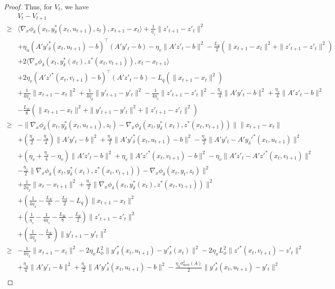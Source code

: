 \documentclass[10pt,a4paper]{amsart}
\newcommand{\pth}[1]{\left( #1 \right)}
\begin{document}
\begin{proof}
Thus, for $V_t$, we have
\begin{align*}
    &V_t-V_{t+1}\\
    \geq& \langle\nabla_x \phi_\delta(x_t, y^*_\delta(x_t, u_{t+1}), z_t), x_{t+1}-x_t\rangle+\frac{1}{\eta_z}\|z'_{t+1}-z'_t\|^2\\
    &+\eta_u(A'y'^*_\delta(x_t,u_{t+1})-b)^\top(A'y'_t-b)-\eta_v\|A'z'_t-b\|^2-\frac{L_d}{2}(\|x_{t+1}-x_t\|^2+\|z'_{t+1}-z'_t\|^2)\\
    &+2\langle\nabla_x \phi_\delta(x_t, y^*_\delta(x_t), z^*(x_t, v_{t+1})), x_t-x_{t+1}\rangle\\
    &+2\eta_v(A'z'^*(x_t,v_{t+1})-b)^\top(A'z'_t-b)-L_q(\|x_{t+1}-x_t\|^2)\\
    &+\frac{1}{4\eta_x}\|x_{t+1}-x_t\|^2+\frac{1}{4\eta_y}\|y'_{t+1}-y'_t\|^2-\frac{1}{4\eta_z}\|z'_{t+1}-z'_t\|^2-\frac{\eta_u}{4}\|A'y'_t-b\|^2+\frac{\eta_v}{4}\|A'z'_t-b\|^2\\
    &-\frac{L_K}{8}(\|x_{t+1}-x_t\|^2+\|y'_{t+1}-y'_t\|^2+\|z'_{t+1}-z'_t\|^2)\\
    \geq&-\|\nabla_x \phi_\delta(x_t, y^*_\delta(x_t, u_{t+1}), z_t)-\nabla_x \phi_\delta(x_t, y^*_\delta(x_t), z^*(x_t, v_{t+1}))\|\|x_{t+1}-x_t\|\\
    &+\pth{\frac{\eta_u}{2}-\frac{\eta_u}{4}}\|A'y'_t-b\|^2+\frac{\eta_u}{2}\|A'y'^*_\delta(x_t,u_{t+1})-b\|^2-\frac{\eta_u}{2}\|A'y'_t-A'y_\delta'^*(x_{t},u_{t+1})\|^2\\
    &+\pth{\eta_v+\frac{\eta_v}{4}-\eta_v}\|A'z'_t-b\|^2+\eta_v\|A'z'^*(x_{t},v_{t+1})-b\|^2-\eta_v\|A'z'_t-A'z'^*(x_{t},v_{t+1})\|^2\\
    &-\frac{\eta_x}{2}\|\nabla_x \phi_\delta(x_t, y^*_\delta(x_t), z^*(x_t, v_{t+1}))-\nabla_x \phi_\delta(x_t, y_t, z_t)\|^2\\
    &+\frac{1}{2\eta_x}\|x_t-x_{t+1}\|^2+\frac{\eta_x}{2}\|\nabla_x \phi_\delta(x_t, y^*_\delta(x_t), z^*(x_t, v_{t+1}))\|^2\\
    &+\pth{\frac{1}{4\eta_x}-\frac{L_K}{8}-\frac{L_d}{2}-L_q}\|x_{t+1}-x_t\|^2\\
    &+\pth{\frac{1}{\eta_z}-\frac{1}{4\eta_z}-\frac{L_K}{8}-\frac{L_d}{2}}\|z'_{t+1}-z'_t\|^2\\
    &+\pth{\frac{1}{4\eta_y}-\frac{L_K}{8}}\|y'_{t+1}-y'_t\|^2\\
    \geq&-\frac{1}{4\eta_x}\|x_{t+1}-x_t\|^2-2\eta_xL_\phi^2\|y'^*_\delta(x_t,u_{t+1})-y'^*_\delta(x_t)\|^2-2\eta_xL_\phi^2\|z'^*(x_t,v_{t+1})-z'_t\|^2\\
    &+\frac{\eta_u}{4}\|A'y'_t-b\|^2+\frac{\eta_u}{2}\|A'y'^*_\delta(x_t,u_{t+1})-b\|^2-\frac{\eta_u \sigma_{\max}^2(A)}{2}\|y'^*_\delta(x_t,u_{t+1})-y'_t\|^2\\

\end{align*}
\end{proof}
\end{document}
